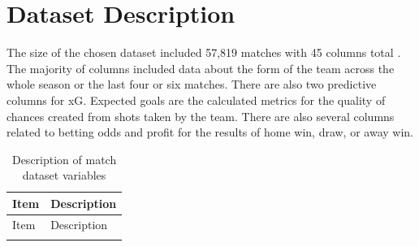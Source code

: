 \documentclass[rgb,listoffigures,listoftables,final]{cam-thesis}
\begin{document}
    \section{Dataset Description}
    The size of the chosen dataset included 57,819 matches with 45 columns total \cite{kaggle}. The majority of columns included data about the form of the team across the whole season or the last four or six matches. There are also two predictive columns for \gls{xG}. Expected goals are the calculated metrics for the quality of chances created from shots taken by the team. There are also several columns related to betting odds and profit for the results of home win, draw, or away win. 
    \begin{center}
    \footnotesize
    \renewcommand{\arraystretch}{1.1}
    \begin{longtable}{ll}
        \caption{\normalsize Description of match dataset variables} \label{tab:match_variables} \\
        \hline
        Item & Description \\
        \hline
        \endfirsthead
    
        \hline
        Item & Description \\
        \hline
        \endhead
    
        \hline
        \endfoot
    
        \hline
        \endlastfoot
    

\end{longtable}
\end{center}
\end{document}
